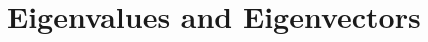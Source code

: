 \documentclass[10pt]{beamer}
\theoremstyle{definition}
\begin{document}
\section{Eigenvalues and Eigenvectors}
\end{document}
